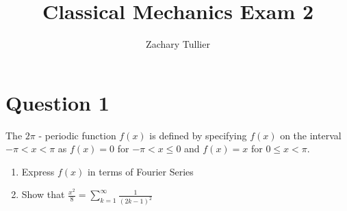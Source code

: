 \documentclass[12pt]{article}
\begin{document}
\singlespacing  %
\title{Classical Mechanics Exam 2}

\author[1]{Zachary Tullier}
\date{}
\maketitle

\section*{Question 1}
    The $2\pi$ - periodic function $f(x)$ is defined by specifying $f(x)$ on the interval $-\pi < x < \pi$ as $f(x) = 0$ for $-\pi < x \leq 0$ and $f(x) = x$ for $0 \leq x < \pi$.
    
    \begin{enumerate}
        \item [a)] Express $f(x)$ in terms of Fourier Series
        \item [b)] Show that $\frac{x^2}{8} = \sum_{k=1}^\infty \frac{1}{(2k-1)^2}$
    \end{enumerate}
\end{document}
